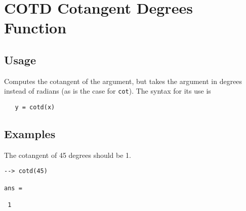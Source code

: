 \section{COTD Cotangent Degrees Function}

\subsection{Usage}

Computes the cotangent of the argument, but takes
the argument in degrees instead of radians (as is the case
for \verb|cot|). The syntax for its use is
\begin{verbatim}
   y = cotd(x)
\end{verbatim}
\subsection{Examples}

The cotangent of 45 degrees should be 1.
\begin{verbatim}
--> cotd(45)

ans = 

 1 
\end{verbatim}
